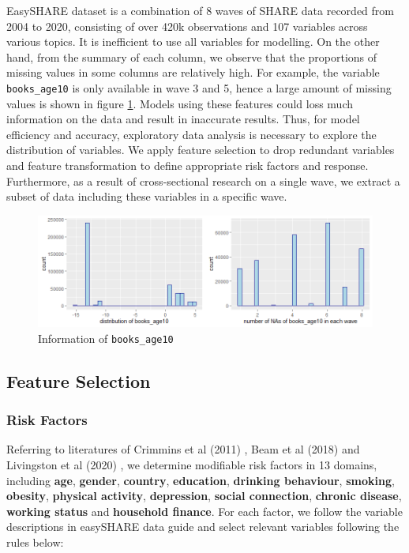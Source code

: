 \documentclass[11pt,twoside]{article}
\numberwithin{Theorem}{section}
\numberwithin{Definition}{section}
\numberwithin{Lemma}{section}
\numberwithin{Algorithm}{section}
\numberwithin{equation}{section}
\begin{document}
EasySHARE dataset is a combination of 8 waves of SHARE data recorded from 2004 to 2020, consisting of over 420k observations and 107 variables across various topics. It is inefficient to use all variables for modelling. On the other hand, from the summary of each column, we observe that the proportions of missing values in some columns are relatively high. For example, the variable \texttt{books\_age10} is only available in wave 3 and 5, hence a large amount of missing values is shown in figure \ref{fig:books_age10}.  Models using these features could loss much information on the data and result in inaccurate results. Thus, for model efficiency and accuracy, exploratory data analysis is necessary to explore the distribution of variables. We apply feature selection to drop redundant variables and feature transformation to define appropriate risk factors and response. Furthermore, as a result of cross-sectional research on a single wave, we extract a subset of data including these variables in a specific wave.

\begin{figure}[!h]
	\centering
	\includegraphics[width = 0.75 \textwidth]{Images/books_age10.png}
	\caption{Information of  \texttt{books\_age10}}
	\label{fig:books_age10}
\end{figure}

\subsection{Feature Selection}

\subsubsection{Risk Factors}

Referring to literatures of Crimmins et al (2011) \cite{crimmins2011assessment}, Beam et al (2018) \cite{beam2018differences} and Livingston et al (2020) \cite{livingston2017dementia}, we determine modifiable risk factors in 13 domains, including \textbf{age},  \textbf{gender}, \textbf{country}, \textbf{education}, \textbf{drinking behaviour}, \textbf{smoking}, \textbf{obesity}, \textbf{physical activity}, \textbf{depression}, \textbf{social connection}, \textbf{chronic disease}, \textbf{working status} and \textbf{household finance}. For each factor, we follow the variable descriptions in easySHARE data guide \cite{gruber2014generating} and select relevant variables following the rules below:
\end{document}
